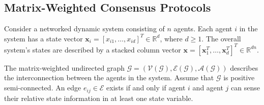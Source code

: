 \documentclass[draftclsnofoot,11pt,onecolumn]{IEEEtran}
\newcommand{\m}[1]{\mathbf{#1}}
\newcommand{\mc}[1]{\mathcal{#1}}
\newcommand{\mb}[1]{\mathbb{#1}}
\begin{document}
\subsection{Matrix-Weighted Consensus Protocols}
Consider a networked dynamic system consisting of $n$ agents. Each agent $i$ in the system has a state vector $\m{x}_i = [x_{i1},\ldots, x_{id}]^T \in \mb{R}^d$, where $d \geq 1$. %
The overall system's states are described by a stacked column vector $\m{x} = [\m{x}_1^T,\ldots,\m{x}_d^T]^T \in \mb{R}^{dn}$. 

The matrix-weighted undirected graph $\mc{G} = (\mc{V}(\mc{G}),\mc{E}(\mc{G}),\mc{A}(\mc{G}))$ describes the interconnection between the agents in the system. Assume that $\mc{G}$ is {positive semi-connected}. An edge $e_{ij} \in \mc{E}$ exists if and only if agent $i$ and agent $j$ can sense their relative state information in at least one state variable. %
\end{document}
